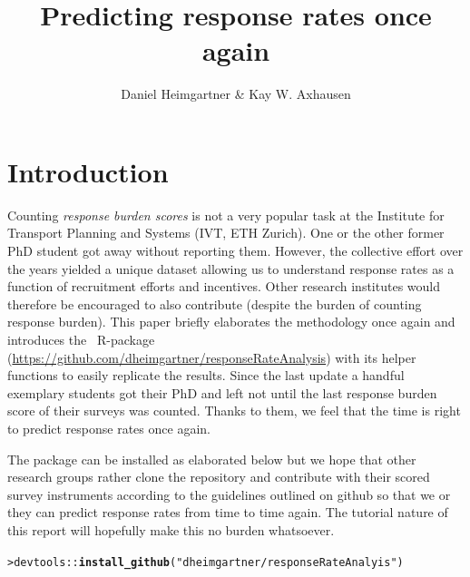 \documentclass[a4paper]{article}\usepackage[]{graphicx}\usepackage[]{xcolor}
\title{Predicting response rates once again}
\author{Daniel Heimgartner \& Kay W. Axhausen}
\makeatletter
\newcommand{\hlsng}[1]{\textcolor[rgb]{0.2,0.2,0.2}{#1}}%
\newcommand{\hlopt}[1]{\textcolor[rgb]{0.102,0.102,0.102}{#1}}%
\newcommand{\hldef}[1]{\textcolor[rgb]{0.102,0.102,0.102}{#1}}%
\newcommand{\hlkwd}[1]{\textcolor[rgb]{0.102,0.102,0.102}{\textbf{#1}}}%
\newenvironment{kframe}{%
 \def\at@end@of@kframe{}%
 \ifinner\ifhmode%
  \def\at@end@of@kframe{\end{minipage}}%
  \begin{minipage}{\columnwidth}%
 \fi\fi%
 \def\FrameCommand##1{\hskip\@totalleftmargin \hskip-\fboxsep
 \colorbox{shadecolor}{##1}\hskip-\fboxsep
     \hskip-\linewidth \hskip-\@totalleftmargin \hskip\columnwidth}%
 \MakeFramed {\advance\hsize-\width
   \@totalleftmargin\z@ \linewidth\hsize
   \@setminipage}}%
 {\par\unskip\endMakeFramed%
 \at@end@of@kframe}
\newenvironment{knitrout}{}{} %
\newcommand{\rlan}{{\sffamily R}}
\newcommand{\responseRateAnalysis}{\pkg{responseRateAnalysis}}
\makeatother
\begin{document}
\maketitle












\section{Introduction}

Counting \textit{response burden scores} \citep{schmid2019predicting} is not a very popular task at the Institute for Transport Planning and Systems (IVT, ETH Zurich). One or the other former PhD student got away without reporting them. However, the collective effort over the years yielded a unique dataset allowing us to understand response rates as a function of recruitment efforts and incentives. Other research institutes would therefore be encouraged to also contribute (despite the burden of counting response burden). This paper briefly elaborates the methodology once again and introduces the \responseRateAnalysis~\rlan-package (\url{https://github.com/dheimgartner/responseRateAnalysis}) with its helper functions to easily replicate the results. Since the last update \citep{axhausen2019predicting} a handful exemplary students got their PhD and left not until the last response burden score of their surveys was counted. Thanks to them, we feel that the time is right to predict response rates once again.

The package can be installed as elaborated below but we hope that other research groups rather clone the repository and contribute with their scored survey instruments according to the guidelines outlined on github so that we or they can predict response rates from time to time again. The tutorial nature of this report will hopefully make this no burden whatsoever.

\begin{knitrout}
\color{fgcolor}\begin{kframe}
\begin{alltt}
\hldef{> }\hldef{devtools}\hlopt{::}\hlkwd{install_github}\hldef{(}\hlsng{"dheimgartner/responseRateAnalyis"}\hldef{)}
\end{alltt}
\end{kframe}
\end{knitrout}
\end{document}

